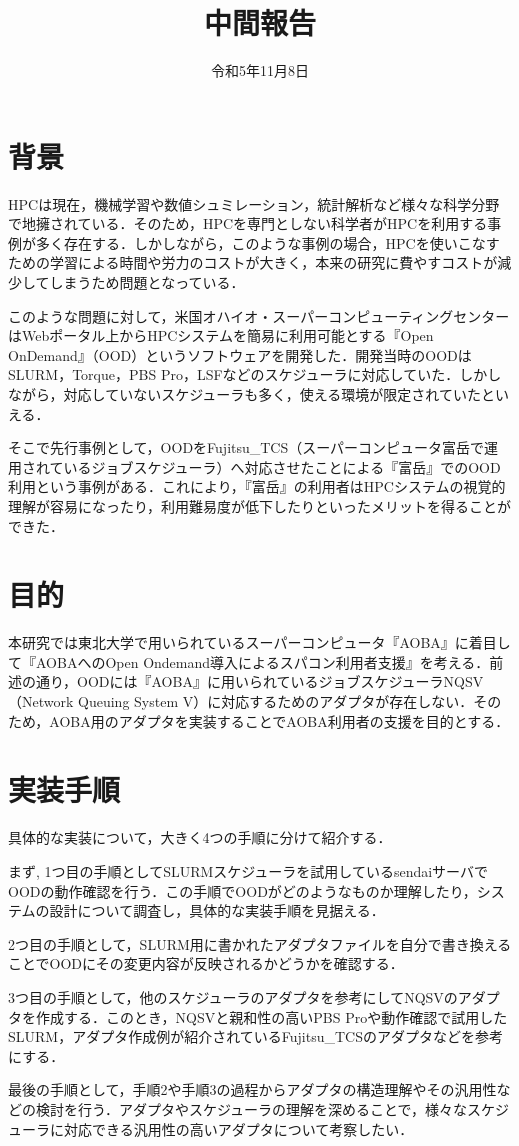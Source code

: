 \documentclass[a4paper,oneside,twocolumn,notitlepage,dvipdfmx]{jsarticle}
\date{令和5年11月8日}
\title{中間報告}
\begin{document}
\maketitle
\section{背景}
HPCは現在，機械学習や数値シュミレーション，統計解析など様々な科学分野で地擁されている．そのため，HPCを専門としない科学者がHPCを利用する事例が多く存在する．しかしながら，このような事例の場合，HPCを使いこなすための学習による時間や労力のコストが大きく，本来の研究に費やすコストが減少してしまうため問題となっている．\par
このような問題に対して，米国オハイオ・スーパーコンピューティングセンターはWebポータル上からHPCシステムを簡易に利用可能とする『Open OnDemand』（OOD）というソフトウェアを開発した．開発当時のOODはSLURM，Torque，PBS Pro，LSFなどのスケジューラに対応していた．しかしながら，対応していないスケジューラも多く，使える環境が限定されていたといえる．\par
そこで先行事例として，OODをFujitsu\_TCS（スーパーコンピュータ富岳で運用されているジョブスケジューラ）へ対応させたことによる『富岳』でのOOD利用という事例がある．\cite{meinronbun}これにより，『富岳』の利用者はHPCシステムの視覚的理解が容易になったり，利用難易度が低下したりといったメリットを得ることができた．\par

\section{目的}
本研究では東北大学で用いられているスーパーコンピュータ『AOBA』に着目して『AOBAへのOpen Ondemand導入によるスパコン利用者支援』を考える．前述の通り，OODには『AOBA』に用いられているジョブスケジューラNQSV（Network Queuing System V）に対応するためのアダプタが存在しない．そのため，AOBA用のアダプタを実装することでAOBA利用者の支援を目的とする．\par

\section{実装手順}
具体的な実装について，大きく4つの手順に分けて紹介する．\par
まず, 1つ目の手順としてSLURMスケジューラを試用しているsendaiサーバでOODの動作確認を行う．この手順でOODがどのようなものか理解したり，システムの設計について調査し，具体的な実装手順を見据える．\par
2つ目の手順として，SLURM用に書かれたアダプタファイルを自分で書き換えることでOODにその変更内容が反映されるかどうかを確認する．\par
3つ目の手順として，他のスケジューラのアダプタを参考にしてNQSVのアダプタを作成する．このとき，NQSVと親和性の高いPBS Proや動作確認で試用したSLURM，アダプタ作成例が紹介されているFujitsu\_TCSのアダプタなどを参考にする．\par
最後の手順として，手順2や手順3の過程からアダプタの構造理解やその汎用性などの検討を行う．アダプタやスケジューラの理解を深めることで，様々なスケジューラに対応できる汎用性の高いアダプタについて考察したい．
\end{document}
